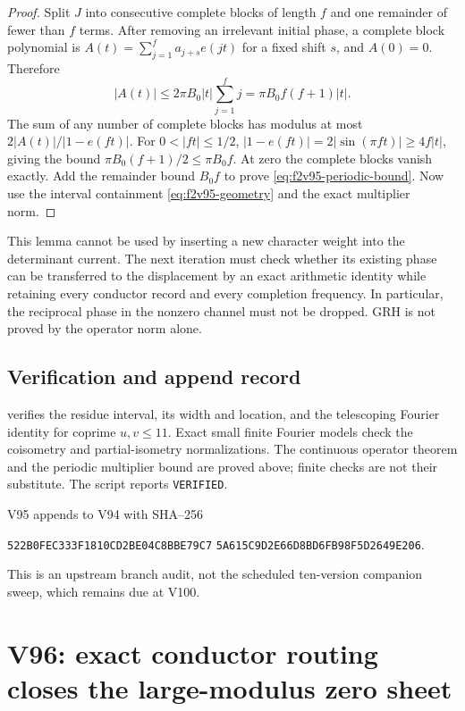 \documentclass[11pt]{article}
\theoremstyle{definition}
\theoremstyle{remark}
\begin{document}
\begin{proof}
Split \(J\) into consecutive complete blocks of length \(f\)
and one remainder of fewer than \(f\) terms.  After removing an
irrelevant initial phase, a complete block polynomial is
\(A(t)=\sum_{j=1}^f a_{j+s}e(jt)\) for a fixed shift \(s\),
and \(A(0)=0\).  Therefore
\[
 |A(t)|\le2\pi B_0|t|\sum_{j=1}^f j
          =\pi B_0f(f+1)|t|.
\]
The sum of any number of complete blocks has modulus at most
\(2|A(t)|/|1-e(ft)|\).  For \(0<|ft|\le1/2\),
\(|1-e(ft)|=2|\sin(\pi ft)|\ge4f|t|\), giving the bound
\(\pi B_0(f+1)/2\le\pi B_0f\).  At zero the complete blocks
vanish exactly.  Add the remainder bound \(B_0f\) to prove
\eqref{eq:f2v95-periodic-bound}.  Now use the interval containment
\eqref{eq:f2v95-geometry} and the exact multiplier norm.
\end{proof}

This lemma cannot be used by inserting a new character weight into the
determinant current.  The next iteration must check whether its existing
phase can be transferred to the displacement by an exact arithmetic
identity while retaining every conductor record and every completion
frequency.  In particular, the reciprocal phase in the nonzero channel
must not be dropped.  GRH is not proved by the operator norm alone.

\subsection*{Verification and append record}

 verifies the residue
interval, its width and location, and the telescoping Fourier identity
for coprime \(u,v\le11\).  Exact small finite Fourier models check
the coisometry and partial-isometry normalizations.  The continuous
operator theorem and the periodic multiplier bound are proved above;
finite checks are not their substitute.  The script reports
\texttt{VERIFIED}.

V95 appends to V94 with SHA--256
\begin{center}
\texttt{522B0FEC333F1810CD2BE04C8BBE79C7}\allowbreak
\texttt{5A615C9D2E66D8BD6FB98F5D2649E206}.
\end{center}
This is an upstream branch audit, not the scheduled ten-version companion
sweep, which remains due at V100.
\endgroup

\clearpage
\section{V96: exact conductor routing closes the large-modulus zero sheet}
\label{sec:f2v96-conductor-routing}
\begingroup
\setcounter{equation}{0}
\renewcommand{\theequation}{N96.\arabic{equation}}
\renewcommand{\theHequation}{f2v96.\arabic{equation}}
\end{document}
